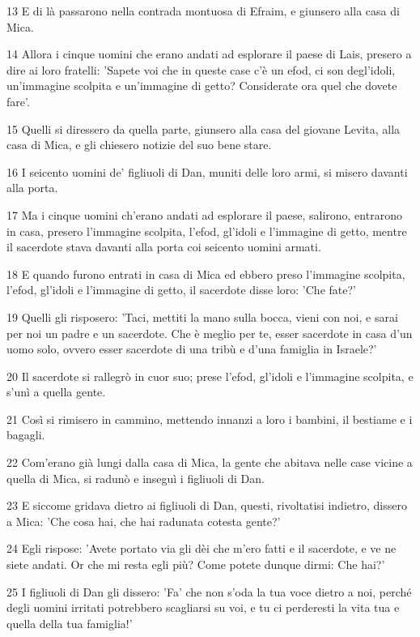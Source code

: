 \par 13 E di là passarono nella contrada montuosa di Efraim, e giunsero alla casa di Mica.
\par 14 Allora i cinque uomini che erano andati ad esplorare il paese di Lais, presero a dire ai loro fratelli: 'Sapete voi che in queste case c'è un efod, ci son degl'idoli, un'immagine scolpita e un'immagine di getto? Considerate ora quel che dovete fare'.
\par 15 Quelli si diressero da quella parte, giunsero alla casa del giovane Levita, alla casa di Mica, e gli chiesero notizie del suo bene stare.
\par 16 I seicento uomini de' figliuoli di Dan, muniti delle loro armi, si misero davanti alla porta.
\par 17 Ma i cinque uomini ch'erano andati ad esplorare il paese, salirono, entrarono in casa, presero l'immagine scolpita, l'efod, gl'idoli e l'immagine di getto, mentre il sacerdote stava davanti alla porta coi seicento uomini armati.
\par 18 E quando furono entrati in casa di Mica ed ebbero preso l'immagine scolpita, l'efod, gl'idoli e l'immagine di getto, il sacerdote disse loro: 'Che fate?'
\par 19 Quelli gli risposero: 'Taci, mettiti la mano sulla bocca, vieni con noi, e sarai per noi un padre e un sacerdote. Che è meglio per te, esser sacerdote in casa d'un uomo solo, ovvero esser sacerdote di una tribù e d'una famiglia in Israele?'
\par 20 Il sacerdote si rallegrò in cuor suo; prese l'efod, gl'idoli e l'immagine scolpita, e s'unì a quella gente.
\par 21 Così si rimisero in cammino, mettendo innanzi a loro i bambini, il bestiame e i bagagli.
\par 22 Com'erano già lungi dalla casa di Mica, la gente che abitava nelle case vicine a quella di Mica, si radunò e inseguì i figliuoli di Dan.
\par 23 E siccome gridava dietro ai figliuoli di Dan, questi, rivoltatisi indietro, dissero a Mica: 'Che cosa hai, che hai radunata cotesta gente?'
\par 24 Egli rispose: 'Avete portato via gli dèi che m'ero fatti e il sacerdote, e ve ne siete andati. Or che mi resta egli più? Come potete dunque dirmi: Che hai?'
\par 25 I figliuoli di Dan gli dissero: 'Fa' che non s'oda la tua voce dietro a noi, perché degli uomini irritati potrebbero scagliarsi su voi, e tu ci perderesti la vita tua e quella della tua famiglia!'
